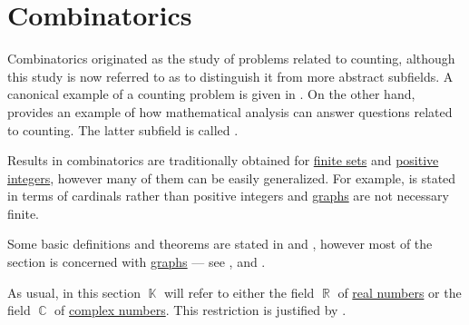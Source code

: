 \section{Combinatorics}\label{sec:combinatorics}

Combinatorics originated as the study of problems related to counting, although this study is now referred to as  to distinguish it from more abstract subfields. A canonical example of a counting problem is given in . On the other hand,  provides an example of how mathematical analysis can answer questions related to counting. The latter subfield is called .

Results in combinatorics are traditionally obtained for \hyperref[def:set_finiteness]{finite sets} and \hyperref[rem:peano_arithmetic_zero/positive]{positive integers}, however many of them can be easily generalized. For example,  is stated in terms of cardinals rather than positive integers and \hyperref[def:graph/simple_directed]{graphs} are not necessary finite.

Some basic definitions and theorems are stated in  and , however most of the section is concerned with \hyperref[def:graph]{graphs} --- see ,  and .

As usual, in this section \( \BbbK \) will refer to either the field \( \BbbR \) of \hyperref[def:set_of_real_numbers]{real numbers} or the field \( \BbbC \) of \hyperref[def:set_of_real_numbers]{complex numbers}. This restriction is justified by .

